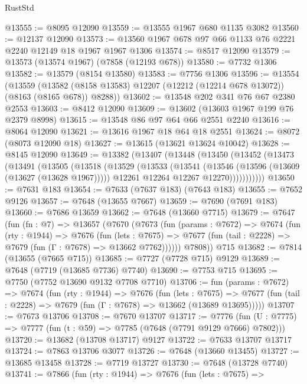 \begin{lexlean}{RustStd}
\begin{coremodule}
@13555 := @8095 @12090
@13559 := @13555 @1967 @680 @1135 @3082
@13560 := @12137 @12090
@13573 := @13560 @1967 @678 @97 @66 @1133 @76 @2221 @2240 @12149 @18 @1967 @1967 @1306
@13574 := @8517 @12090
@13579 := @13573 (@13574 @1967) (@7858 (@12193 @678))
@13580 := @7732 @1306
@13582 := @13579 (@8154 @13580)
@13583 := @7756 @1306
@13596 := @13554
    (@13559 (@13582 (@8158 @13583) @12207 (@12212 (@12214 @678 @13072)) (@8163 (@8165 @678)) @8288))
@13602 := @13548 @202 @341 @76 @67 @2380 @2553
@13603 := @8412 @12090
@13609 := @13602 (@13603 @1967 @199 @76 @2379 @8998)
@13615 := @13548 @86 @97 @64 @66 @2551 @2240
@13616 := @8064 @12090
@13621 := @13616 @1967 @18 @64 @18 @2551
@13624 := @8072 (@8073 @12090 @18)
@13627 := @13615 (@13621 @13624 @10042)
@13628 := @8145 @12090
@13649 := @13382
    (@13407
      (@13448
        (@13450
          (@13452
            (@13473
              (@13491
                (@13505
                  (@13518
                    (@13529
                      (@13533
                        (@13541
                          (@13546 (@13596 (@13609 (@13627 (@13628 @1967)))))
                          @12261
                          @12264
                          @12267
                          @12270)))))))))))
@13650 := @7631 @183
@13654 := @7633 (@7637 @183) (@7643 @183)
@13655 := @7652 @9126
@13657 := @7648 (@13655 @7667)
@13659 := @7690 (@7691 @183)
@13660 := @7686 @13659
@13662 := @7648 (@13660 @7715)
@13679 := @7647
    (fun (fn : @7) =>
    @13657
      (@7670
        (@7673
          (fun (params : @7672) =>
          @7674
            (fun (rty : @1944) =>
            @7676
              (fun (lets : @7675) =>
              @7677 (fun (tail : @2228) => @7679 (fun (Γ : @7678) => @13662 @7762))))))
        @7808))
    @715
@13682 := @7814 (@13655 (@7665 @715))
@13685 := @7727 (@7728 @715) @9129
@13689 := @7648 (@7719 (@13685 @7736) @7740)
@13690 := @7753 @715
@13695 := @7750 (@7752 @13690 @9132 @7708 @7710)
@13706 := fun (params : @7672) =>
  @7674
    (fun (rty : @1944) =>
    @7676
      (fun (lets : @7675) =>
      @7677 (fun (tail : @2228) => @7679 (fun (Γ : @7678) => @13662 (@13689 @13695)))))
@13707 := @7673 @13706
@13708 := @7670 @13707
@13717 := @7776
    (fun (U : @7775) => @7777 (fun (t : @59) => @7785 (@7648 (@7791 @9129 @7666) @7802)))
@13720 := @13682 (@13708 @13717) @9127
@13722 := @7633 @13707 @13717
@13724 := @7863 @13706 @3077
@13726 := @7648 (@13660 @13455)
@13727 := @13685 @13458
@13728 := @7719 @13727
@13730 := @7648 (@13728 @7740)
@13741 := @7866
    (fun (rty : @1944) =>
    @7676
      (fun (lets : @7675) =>

\end{coremodule}
\end{lexlean}
